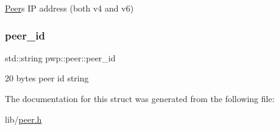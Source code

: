 \hyperlink{classPeer}{Peer}\textquotesingle{}s IP address (both v4 and v6) \mbox{\label{structpwp_1_1peer_a93c9dfe3e8766d364887f615d0880777}} 
\subsubsection{\texorpdfstring{peer\+\_\+id}{peer\_id}}
{\footnotesize\ttfamily std\+::string pwp\+::peer\+::peer\+\_\+id}

20 bytes peer id string 

The documentation for this struct was generated from the following file\+:\begin{DoxyCompactItemize}
\item 
lib/\hyperlink{peer_8h}{peer.\+h}\end{DoxyCompactItemize}
